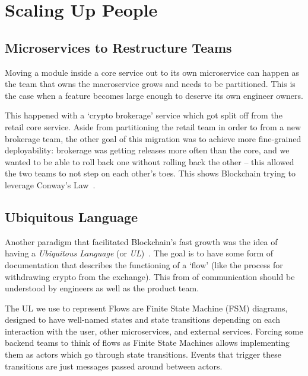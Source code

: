 \documentclass[conference]{IEEEtran}
\begin{document}
    \section{Scaling Up People}

    \subsection{Microservices to Restructure Teams}

    Moving a module inside a core service out to its own microservice can happen as the team that
    owns the macroservice grows and needs to be partitioned.
    This is the case when a feature becomes large enough to deserve its own engineer owners.

    This happened with a `crypto brokerage' service which got split off from the retail core
    service.
    Aside from partitioning the retail team in order to from a new brokerage team, the other goal of
    this migration was to achieve more fine-grained deployability: brokerage was getting releases
    more often than the core, and we wanted to be able to roll back one without rolling back the
    other -- this allowed the two teams to not step on each other's toes.
    This shows Blockchain trying to leverage Conway's Law~\cite{conwayLaw}.

    \subsection{Ubiquitous Language}\label{subsec:ul}

    Another paradigm that facilitated Blockchain's fast growth was the idea of having a
    \emph{Ubiquitous Language} (or \emph{UL})~\cite{evansDomainDrivenDesignUL, fowlerUL}.
    The goal is to have some form of documentation that describes the functioning of a `flow' (like
    the process for withdrawing crypto from the exchange).
    This from of communication should be understood by engineers as well as the product team.

    The UL we use to represent Flows are Finite State Machine (FSM) diagrams, designed to have well-named states and state transitions depending on each interaction with the user, other microservices, and external services.
    Forcing some backend teams to think of flows as Finite State Machines allows implementing
    them as actors which go through state transitions.
    Events that trigger these transitions are just messages passed around between actors.
\end{document}
